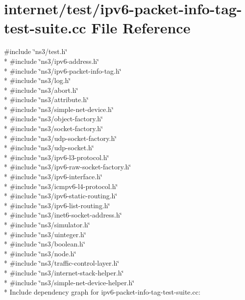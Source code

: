 \hypertarget{ipv6-packet-info-tag-test-suite_8cc}{}\section{internet/test/ipv6-\/packet-\/info-\/tag-\/test-\/suite.cc File Reference}
\label{ipv6-packet-info-tag-test-suite_8cc}
{\ttfamily \#include \char`\"{}ns3/test.\+h\char`\"{}}\\*
{\ttfamily \#include \char`\"{}ns3/ipv6-\/address.\+h\char`\"{}}\\*
{\ttfamily \#include \char`\"{}ns3/ipv6-\/packet-\/info-\/tag.\+h\char`\"{}}\\*
{\ttfamily \#include \char`\"{}ns3/log.\+h\char`\"{}}\\*
{\ttfamily \#include \char`\"{}ns3/abort.\+h\char`\"{}}\\*
{\ttfamily \#include \char`\"{}ns3/attribute.\+h\char`\"{}}\\*
{\ttfamily \#include \char`\"{}ns3/simple-\/net-\/device.\+h\char`\"{}}\\*
{\ttfamily \#include \char`\"{}ns3/object-\/factory.\+h\char`\"{}}\\*
{\ttfamily \#include \char`\"{}ns3/socket-\/factory.\+h\char`\"{}}\\*
{\ttfamily \#include \char`\"{}ns3/udp-\/socket-\/factory.\+h\char`\"{}}\\*
{\ttfamily \#include \char`\"{}ns3/udp-\/socket.\+h\char`\"{}}\\*
{\ttfamily \#include \char`\"{}ns3/ipv6-\/l3-\/protocol.\+h\char`\"{}}\\*
{\ttfamily \#include \char`\"{}ns3/ipv6-\/raw-\/socket-\/factory.\+h\char`\"{}}\\*
{\ttfamily \#include \char`\"{}ns3/ipv6-\/interface.\+h\char`\"{}}\\*
{\ttfamily \#include \char`\"{}ns3/icmpv6-\/l4-\/protocol.\+h\char`\"{}}\\*
{\ttfamily \#include \char`\"{}ns3/ipv6-\/static-\/routing.\+h\char`\"{}}\\*
{\ttfamily \#include \char`\"{}ns3/ipv6-\/list-\/routing.\+h\char`\"{}}\\*
{\ttfamily \#include \char`\"{}ns3/inet6-\/socket-\/address.\+h\char`\"{}}\\*
{\ttfamily \#include \char`\"{}ns3/simulator.\+h\char`\"{}}\\*
{\ttfamily \#include \char`\"{}ns3/uinteger.\+h\char`\"{}}\\*
{\ttfamily \#include \char`\"{}ns3/boolean.\+h\char`\"{}}\\*
{\ttfamily \#include \char`\"{}ns3/node.\+h\char`\"{}}\\*
{\ttfamily \#include \char`\"{}ns3/traffic-\/control-\/layer.\+h\char`\"{}}\\*
{\ttfamily \#include \char`\"{}ns3/internet-\/stack-\/helper.\+h\char`\"{}}\\*
{\ttfamily \#include \char`\"{}ns3/simple-\/net-\/device-\/helper.\+h\char`\"{}}\\*
Include dependency graph for ipv6-\/packet-\/info-\/tag-\/test-\/suite.cc\+:
